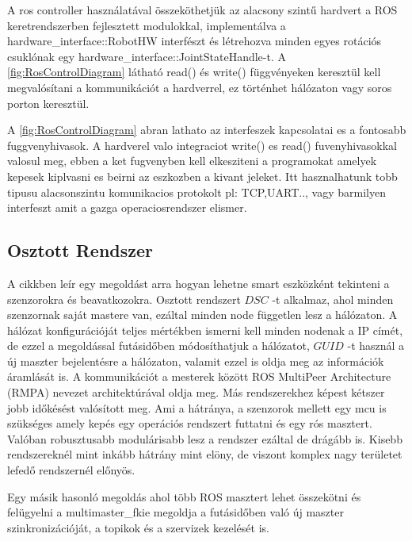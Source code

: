 A ros controller  \cite{roscontrol} használatával összeköthetjük az alacsony szintű hardvert a ROS keretrendszerben fejlesztett modulokkal, implementálva \cite{ROSControlExample} a hardware\_interface::RobotHW interfészt és létrehozva minden egyes rotációs csuklónak egy \newline hardware\_interface::JointStateHandle-t. A \ref{fig:RosControlDiagram} látható read() és write() függvényeken keresztül kell megvalósítani a kommunikációt a hardverrel, ez történhet hálózaton vagy soros porton keresztül.

\renewcommand{\img}{AktualisTudomany/roscontrol.png}
\renewcommand{\sources}{Forrás: https://www.army-technology.com}
\renewcommand{\captionn}{Ros Control modulok}
\renewcommand{\figlabel}{RosControlDiagram}


A \ref{fig:RosControlDiagram} abran lathato az interfeszek kapcsolatai es a fontosabb fuggvenyhivasok. A hardverel valo integraciot write() es read() fuvenyhivasokkal valosul meg, ebben a ket fugvenyben kell elkesziteni a programokat amelyek kepesek kiplvasni es beirni az eszkozben a kivant jeleket. Itt hasznalhatunk tobb tipusu alacsonszintu komunikacios protokolt pl: TCP,UART.., vagy barmilyen interfeszt amit a gazga operaciosrendszer elismer.

\subsection*{Osztott Rendszer}

A  \cite{DistributedRealTimeControlROS} cikkben leír egy megoldást arra hogyan lehetne smart eszközként tekinteni a szenzorokra és beavatkozokra. Osztott rendszert $DSC$ -t alkalmaz, ahol minden szenzornak saját mastere van, ezáltal minden node független lesz a hálózaton. A hálózat konfigurációját teljes mértékben ismerni kell minden nodenak a IP címét, de ezzel a megoldással futásidőben módosíthatjuk a hálózatot, $GUID$ -t használ a új maszter bejelentésre a hálózaton, valamit ezzel is oldja meg az információk áramlását is.
A kommunikációt a mesterek között ROS MultiPeer Architecture (RMPA) nevezet architektúrával oldja meg. Más rendszerekhez képest kétszer jobb időkésést valósított meg. 
Ami a hátránya, a szenzorok mellett egy mcu is szükséges amely kepés egy operációs rendszert futtatni és egy rós masztert. Valóban robusztusabb modulárisabb lesz a rendszer ezáltal de drágább is. Kisebb rendszereknél mint inkább hátrány mint elöny, de viszont komplex nagy területet lefedő rendszernél előnyös.

Egy másik hasonló megoldás ahol több ROS masztert lehet összekötni és felügyelni a multimaster\_fkie megoldja a futásidőben való új maszter szinkronizációját, a topikok és a szervizek kezelését is. 


